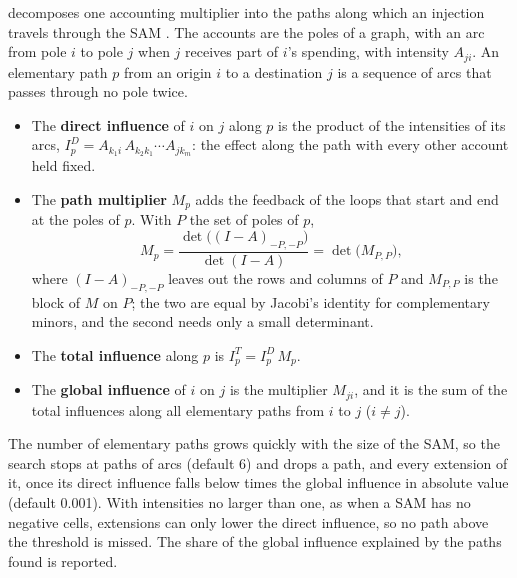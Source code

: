  decomposes one accounting multiplier into the paths along
which an injection travels through the SAM \citep{defourny1984}. The accounts
are the poles of a graph, with an arc from pole $i$ to pole $j$ when $j$
receives part of $i$'s spending, with intensity $A_{ji}$. An elementary path
$p$ from an origin $i$ to a destination $j$ is a sequence of arcs that passes
through no pole twice.
\begin{itemize}
\item The \textbf{direct influence} of $i$ on $j$ along $p$ is the product of
the intensities of its arcs, $I^D_p = A_{k_1 i}\,A_{k_2 k_1} \cdots A_{j k_m}$:
the effect along the path with every other account held fixed.
\item The \textbf{path multiplier} $M_p$ adds the feedback of the loops that
start and end at the poles of $p$. With $P$ the set of poles of $p$,
\begin{equation*}
M_p = \frac{\det\bigl((I - A)_{-P,-P}\bigr)}{\det(I - A)} = \det\bigl(M_{P,P}\bigr),
\end{equation*}
where $(I - A)_{-P,-P}$ leaves out the rows and columns of $P$ and $M_{P,P}$ is
the block of $M$ on $P$; the two are equal by Jacobi's identity for
complementary minors, and the second needs only a small determinant.
\item The \textbf{total influence} along $p$ is $I^T_p = I^D_p\,M_p$.
\item The \textbf{global influence} of $i$ on $j$ is the multiplier $M_{ji}$,
and it is the sum of the total influences along all elementary paths from $i$
to $j$ ($i \ne j$).
\end{itemize}
The number of elementary paths grows quickly with the size of the SAM, so the
search stops at paths of  arcs (default 6) and drops a path,
and every extension of it, once its direct influence falls below
 times the global influence in absolute value (default 0.001).
With intensities no larger than one, as when a SAM has no negative cells,
extensions can only lower the direct influence, so no path above the threshold
is missed. The share of the global influence explained by the paths found is
reported.
